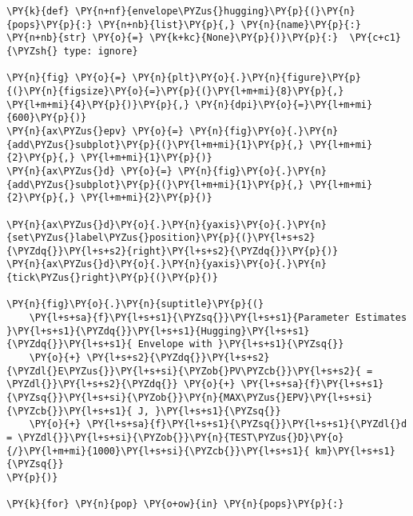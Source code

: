 \begin{tcolorbox}[breakable, size=fbox, boxrule=1pt, pad at break*=1mm,colback=cellbackground, colframe=cellborder]
\begin{Verbatim}[commandchars=\\\{\}]
\PY{k}{def} \PY{n+nf}{envelope\PYZus{}hugging}\PY{p}{(}\PY{n}{pops}\PY{p}{:} \PY{n+nb}{list}\PY{p}{,} \PY{n}{name}\PY{p}{:} \PY{n+nb}{str} \PY{o}{=} \PY{k+kc}{None}\PY{p}{)}\PY{p}{:}  \PY{c+c1}{\PYZsh{} type: ignore}

\PY{n}{fig} \PY{o}{=} \PY{n}{plt}\PY{o}{.}\PY{n}{figure}\PY{p}{(}\PY{n}{figsize}\PY{o}{=}\PY{p}{(}\PY{l+m+mi}{8}\PY{p}{,} \PY{l+m+mi}{4}\PY{p}{)}\PY{p}{,} \PY{n}{dpi}\PY{o}{=}\PY{l+m+mi}{600}\PY{p}{)}
\PY{n}{ax\PYZus{}epv} \PY{o}{=} \PY{n}{fig}\PY{o}{.}\PY{n}{add\PYZus{}subplot}\PY{p}{(}\PY{l+m+mi}{1}\PY{p}{,} \PY{l+m+mi}{2}\PY{p}{,} \PY{l+m+mi}{1}\PY{p}{)}
\PY{n}{ax\PYZus{}d} \PY{o}{=} \PY{n}{fig}\PY{o}{.}\PY{n}{add\PYZus{}subplot}\PY{p}{(}\PY{l+m+mi}{1}\PY{p}{,} \PY{l+m+mi}{2}\PY{p}{,} \PY{l+m+mi}{2}\PY{p}{)}

\PY{n}{ax\PYZus{}d}\PY{o}{.}\PY{n}{yaxis}\PY{o}{.}\PY{n}{set\PYZus{}label\PYZus{}position}\PY{p}{(}\PY{l+s+s2}{\PYZdq{}}\PY{l+s+s2}{right}\PY{l+s+s2}{\PYZdq{}}\PY{p}{)}
\PY{n}{ax\PYZus{}d}\PY{o}{.}\PY{n}{yaxis}\PY{o}{.}\PY{n}{tick\PYZus{}right}\PY{p}{(}\PY{p}{)}

\PY{n}{fig}\PY{o}{.}\PY{n}{suptitle}\PY{p}{(}
    \PY{l+s+sa}{f}\PY{l+s+s1}{\PYZsq{}}\PY{l+s+s1}{Parameter Estimates }\PY{l+s+s1}{\PYZdq{}}\PY{l+s+s1}{Hugging}\PY{l+s+s1}{\PYZdq{}}\PY{l+s+s1}{ Envelope with }\PY{l+s+s1}{\PYZsq{}}
    \PY{o}{+} \PY{l+s+s2}{\PYZdq{}}\PY{l+s+s2}{\PYZdl{}E\PYZus{}}\PY{l+s+si}{\PYZob{}PV\PYZcb{}}\PY{l+s+s2}{ = \PYZdl{}}\PY{l+s+s2}{\PYZdq{}} \PY{o}{+} \PY{l+s+sa}{f}\PY{l+s+s1}{\PYZsq{}}\PY{l+s+si}{\PYZob{}}\PY{n}{MAX\PYZus{}EPV}\PY{l+s+si}{\PYZcb{}}\PY{l+s+s1}{ J, }\PY{l+s+s1}{\PYZsq{}}
    \PY{o}{+} \PY{l+s+sa}{f}\PY{l+s+s1}{\PYZsq{}}\PY{l+s+s1}{\PYZdl{}d = \PYZdl{}}\PY{l+s+si}{\PYZob{}}\PY{n}{TEST\PYZus{}D}\PY{o}{/}\PY{l+m+mi}{1000}\PY{l+s+si}{\PYZcb{}}\PY{l+s+s1}{ km}\PY{l+s+s1}{\PYZsq{}}
\PY{p}{)}

\PY{k}{for} \PY{n}{pop} \PY{o+ow}{in} \PY{n}{pops}\PY{p}{:}


\end{Verbatim}
\end{tcolorbox}
